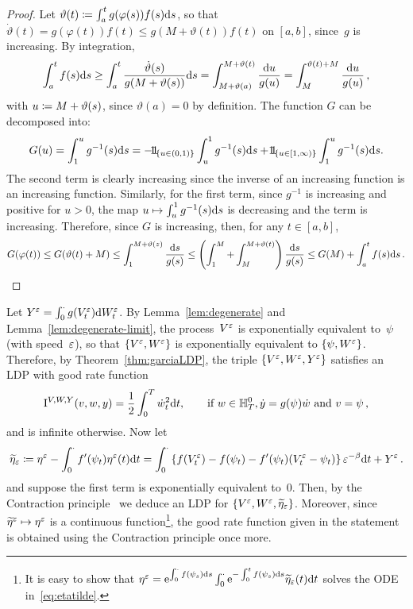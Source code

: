 \begin{proof}
Let $\vartheta(t) \coloneqq \int_a^{t} g(\varphi(s))f(s)\mathrm{d} s$, so that
$\dot{\vartheta}(t) = g(\varphi(t))f(t) \leq g(M+\vartheta(t)) f(t)$ on $[a,b]$,
since~$g$ is increasing. By integration,
$$
\int_a^tf(s)\mathrm{d} s \geq \int_a^t \frac{\dot{\vartheta}(s)}{g(M+\vartheta(s))}\mathrm{d} s 
= \int_{M+\vartheta(a)}^{M+\vartheta(t)}\frac{\mathrm{d} u}{g(u)}
=  \int_{M}^{\vartheta(t)+M}\frac{\mathrm{d} u}{g(u)}\,,
$$
with $u\coloneqq M+\vartheta(s)$, since $\vartheta(a)=0$ by definition. The function $G$ can be decomposed into:
\[
G(u) = \int_1^u g^{-1}(s)\D s = - \ind_{\{u\in(0,1)\}} \int_u^1 g^{-1}(s)\D s + \ind_{\{u\in[1,\infty)\}}\int_1^u g^{-1}(s)\D s.
\]
The second term is clearly increasing since the inverse of an increasing function is an increasing function. Similarly, for the first term, since $g^{-1}$ is increasing and positive for $u>0$, the map $u\mapsto\int_u^1g^{-1}(s)\mathrm{d} s$ is decreasing and the term is increasing. Therefore, since $G$ is increasing, then, for any $t\in[a,b]$,
$$
G(\varphi(t)) \leq G(\vartheta(t) + M) 
\leq \int_1^{M +\vartheta(z)}\frac{\mathrm{d} s}{g(s)}
\leq \left(\int_{1}^{M}+ \int_{M}^{M+\vartheta(t)}\right)\frac{\mathrm{d} s}{g(s)}
\leq G(M) + \int_a^t f(s)\mathrm{d} s\,.
$$
\end{proof}
Let $Y^\varepsilon=\int_0^\cdot g(V^\varepsilon_t)\mathrm{d} W_t^{\varepsilon}$.
By Lemma~\ref{lem:degenerate} and Lemma~\ref{lem:degenerate-limit}, 
the process~$V^\varepsilon$ is exponentially equivalent to~$\psi$
(with speed~$\varepsilon$),
so that $\{V^\varepsilon,W^{\varepsilon}\}$ is exponentially equivalent to $\{\psi,W^{\varepsilon}\}$. 
Therefore, by Theorem~\ref{thm:garciaLDP}, the triple $\{V^\varepsilon,W^{\varepsilon},Y^\varepsilon\}$ satisfies an LDP with good rate function
$$
\mathrm{I}^{V,W,Y}(v,w,y) = 
\frac{1}{2}\int_0^T\dot{w}_t^2\mathrm{d} t,
\qquad \text{if } w \in \mathbb{H}_T^0,\dot{y} = g(\psi)\dot{w} \text{ and } v = \psi\,,
$$
and is infinite otherwise. Now let 
\begin{equation}\label{eq:etatilde}
\widetilde{\eta}_\varepsilon \coloneqq \eta^{\varepsilon} - \int_0^\cdot f'(\psi_t)\eta^\varepsilon(t) \mathrm{d} t = \int_0^\cdot \left\{f(V^\varepsilon_t) - f(\psi_t) - f'(\psi_t)(V^\varepsilon_t - \psi_t)\right\}\varepsilon^{-\beta}\mathrm{d} t + Y^\varepsilon\,.
\end{equation}
and suppose the first term is exponentially equivalent to~$0$. Then, by the Contraction principle~\cite[Theorem 4.2.1]{Dembo2010LargeApplications} 
we deduce an LDP for $\{V^\varepsilon, W^{\varepsilon}, \widetilde{\eta}_\varepsilon\}$. Moreover, since $\widetilde{\eta}^\varepsilon \mapsto \eta^\varepsilon$ is a continuous function\footnote{It is easy to show that $\eta^{\varepsilon} =\mathrm{e}^{\int_0^\cdot f(\psi_s)\mathrm{d} s}\int_0^\cdot \mathrm{e}^{-\int_0^t f(\psi_s)\mathrm{d} s}\widetilde{\eta}_\varepsilon(t) \mathrm{d} t $ solves the ODE in~\eqref{eq:etatilde}.}, the good rate function given in the statement is obtained using the Contraction principle once more. 
